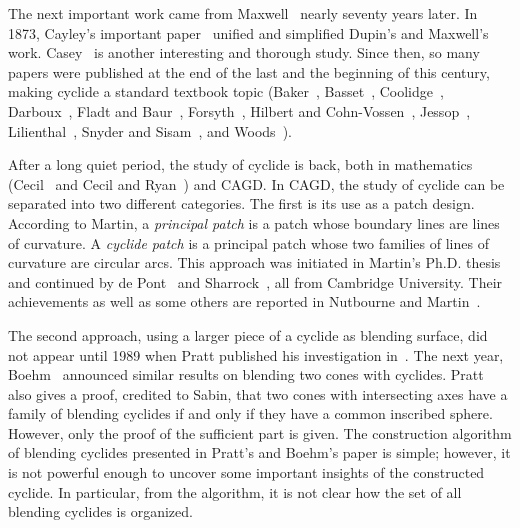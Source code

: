     The next important work came from 
Maxwell~\cite{maxwell:1868} nearly seventy years later.  
In 1873, Cayley's important paper~\cite{cayley:1873} 
unified and simplified Dupin's and Maxwell's work.  
Casey~\cite{casey:1871}
is another interesting and thorough study.  Since then, so many papers
were published at the end of the last and the beginning of this century, 
making cyclide a standard textbook topic 
(Baker~\cite{baker:1925}, 
Basset~\cite{basset:1910},
Coolidge~\cite{coolidge:1916}, 
Darboux~\cite{darboux:1896,darboux:1917},
Fladt and 
Baur~\cite{fladt-baur:1975}, 
Forsyth~\cite{forsyth:1912}, 
Hilbert and
Cohn-Vossen~\cite{hilbert-vossen:1952}, 
Jessop~\cite{jessop:1916},
Lilienthal~\cite{lilienthal:1913}, 
Snyder and Sisam~\cite{snyder-sisam:1914},
and Woods~\cite{woods:1922}).

     After a long quiet period, the study of cyclide is back, both in 
mathematics (Cecil~\cite{cecil:1992} and 
Cecil and Ryan~\cite{cecil-ryan:1985})
and CAGD.  In CAGD, the study of cyclide can be separated into two
different categories.  The first is its use as a patch design.  
According to Martin, a {\em principal patch} is a patch
whose boundary lines  are lines of curvature.  
A {\em cyclide patch} is
a principal patch whose two families of lines of curvature are circular arcs.
This approach was initiated in 
Martin's Ph.D. thesis~\cite{martin:1982} and 
continued by de Pont~\cite{depont:1984} and 
Sharrock~\cite{sharrock:1985}, 
all from Cambridge University.  Their achievements as well as some others are 
reported in 
Nutbourne and Martin~\cite{nutbourne-martin:1988}.

     The second approach, using a larger piece of a cyclide as blending
surface, did not appear until 1989 when Pratt published his 
investigation in~\cite{pratt:1989,pratt:1990}.
The next year, Boehm~\cite{boehm:1990}
announced similar results on blending 
two cones with cyclides.  
Pratt~\cite{pratt:1990} also gives a proof, credited to
Sabin, that two cones with intersecting axes have a family of blending 
cyclides if and only if they
have a common inscribed sphere.  However, only the proof of the sufficient
part is given.  The construction algorithm of blending cyclides presented in 
Pratt's and Boehm's paper is simple; however, it is not powerful
enough to uncover some important insights of the constructed cyclide.
In particular, from the algorithm, it is not clear how the set of all
blending cyclides is organized.

